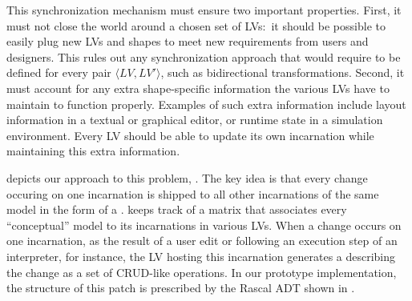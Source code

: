 This synchronization mechanism must ensure two important properties.
First, it must not close the world around a chosen set of LVs:~it should be possible to easily plug new LVs and shapes to meet new requirements from users and designers.
This rules out any synchronization approach that would require to be defined for every pair $\langle LV, LV' \rangle$, such as bidirectional transformations. 
Second, it must account for any extra shape-specific information the various LVs have to maintain to function properly.
Examples of such extra information include layout information in a textual or graphical editor, or runtime state in a simulation environment.
Every LV should be able to update its own incarnation while maintaining this extra information.

 depicts our approach to this problem, \prism.
The key idea is that every change occuring on one incarnation is shipped to all other incarnations of the same model in the form of a \patch.
\prism keeps track of a matrix that associates every ``conceptual'' model to its incarnations in various LVs.
When a change occurs on one incarnation, as the result of a user edit or following an execution step of an interpreter, for instance, the LV hosting this incarnation generates a \patch describing the change as a set of CRUD-like operations.
In our prototype implementation, the structure of this patch is prescribed by the Rascal ADT shown in .
